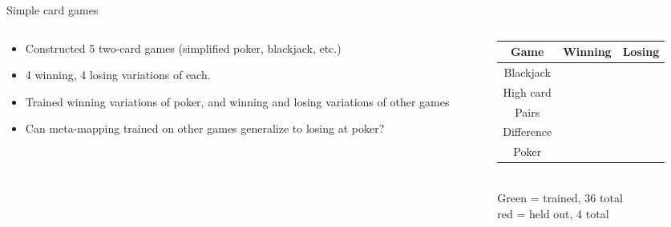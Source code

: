 \documentclass{beamer}
\begin{document}
\begin{frame}{Simple card games}
\begin{columns}
\begin{column}{0.5\textwidth}
\begin{itemize}
\item Constructed 5 two-card games (simplified poker, blackjack, etc.)
\item 4 winning, 4 losing variations of each.
\item Trained winning variations of poker, and winning and losing variations of other games 
\item Can meta-mapping trained on other games generalize to losing at poker?
\end{itemize}
\end{column}
\begin{column}{0.5\textwidth}
\begin{center}
\begin{tabular}{|c|cc|}
\hline
\textbf{Game} & \textbf{Winning} & \textbf{\phantom{i}Losing\phantom{i}} \\
\hline
Blackjack & \cellcolor{bgreen} & \cellcolor{bgreen}\\
High card & \cellcolor{bgreen} & \cellcolor{bgreen}\\
Pairs & \cellcolor{bgreen} & \cellcolor{bgreen}\\
Difference & \cellcolor{bgreen} & \cellcolor{bgreen}\\
Poker & \cellcolor{bgreen} & \cellcolor{bred}\\
\hline
\end{tabular}\\[0.5em]
{\color{bgreen}Green = trained, 36 total}\\
{\color{bred}red = held out, 4 total}
\end{center}
\end{column}
\end{columns}

\end{frame}
\end{document}
